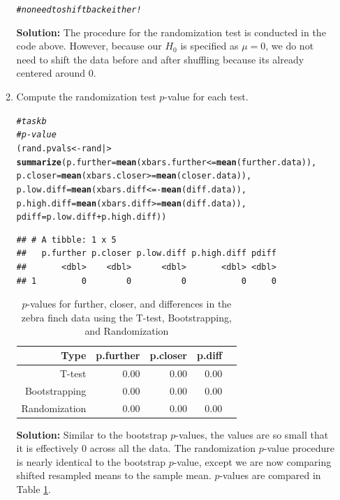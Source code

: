 \documentclass{article}\usepackage[]{graphicx}\usepackage[]{xcolor}
\makeatletter
\newcommand{\hlcom}[1]{\textcolor[rgb]{0.678,0.584,0.686}{\textit{#1}}}%
\newcommand{\hlopt}[1]{\textcolor[rgb]{0,0,0}{#1}}%
\newcommand{\hldef}[1]{\textcolor[rgb]{0.345,0.345,0.345}{#1}}%
\newcommand{\hlkwb}[1]{\textcolor[rgb]{0.69,0.353,0.396}{#1}}%
\newcommand{\hlkwc}[1]{\textcolor[rgb]{0.333,0.667,0.333}{#1}}%
\newcommand{\hlkwd}[1]{\textcolor[rgb]{0.737,0.353,0.396}{\textbf{#1}}}%
\newenvironment{kframe}{%
 \def\at@end@of@kframe{}%
 \ifinner\ifhmode%
  \def\at@end@of@kframe{\end{minipage}}%
  \begin{minipage}{\columnwidth}%
 \fi\fi%
 \def\FrameCommand##1{\hskip\@totalleftmargin \hskip-\fboxsep
 \colorbox{shadecolor}{##1}\hskip-\fboxsep
     \hskip-\linewidth \hskip-\@totalleftmargin \hskip\columnwidth}%
 \MakeFramed {\advance\hsize-\width
   \@totalleftmargin\z@ \linewidth\hsize
   \@setminipage}}%
 {\par\unskip\endMakeFramed%
 \at@end@of@kframe}
\newenvironment{knitrout}{}{} %
\makeatother
\begin{document}
\begin{enumerate}
\begin{enumerate}
\begin{knitrout}
\begin{kframe}
\begin{alltt}
\hlcom{# no need to shift back either!}
\end{alltt}
\end{kframe}
\end{knitrout}
\textbf{Solution:} The procedure for the randomization test is conducted in the code above. However, because our $H_0$ is specified as $\mu = 0$, we do not need to shift the data before and after shuffling because its already centered around $0$. 
  \item Compute the randomization test $p$-value for each test. \\
\begin{knitrout}
\color{fgcolor}\begin{kframe}
\begin{alltt}
\hlcom{# task b}
\hlcom{# p-value }
\hldef{(rand.pvals} \hlkwb{<-} \hldef{rand |>}
\hlkwd{summarize}\hldef{(}\hlkwc{p.further} \hldef{=} \hlkwd{mean}\hldef{(xbars.further} \hlopt{<=} \hlkwd{mean}\hldef{(further.data)),}
          \hlkwc{p.closer} \hldef{=} \hlkwd{mean}\hldef{(xbars.closer} \hlopt{>=} \hlkwd{mean}\hldef{(closer.data)),}
          \hlkwc{p.low.diff} \hldef{=} \hlkwd{mean}\hldef{(xbars.diff} \hlopt{<= -}\hlkwd{mean}\hldef{(diff.data)),}
          \hlkwc{p.high.diff} \hldef{=} \hlkwd{mean}\hldef{(xbars.diff} \hlopt{>=} \hlkwd{mean}\hldef{(diff.data)),}
          \hlkwc{pdiff} \hldef{= p.low.diff} \hlopt{+} \hldef{p.high.diff))}
\end{alltt}
\begin{verbatim}
## # A tibble: 1 x 5
##   p.further p.closer p.low.diff p.high.diff pdiff
##       <dbl>    <dbl>      <dbl>       <dbl> <dbl>
## 1         0        0          0           0     0
\end{verbatim}
\end{kframe}
\end{knitrout}
\begin{table}[ht]
\centering
\begin{tabular}{rrrrr}
  \hline
 Type & p.further & p.closer & p.diff \\ 
  \hline
T-test & 0.00 & 0.00 & 0.00 \\ 
  Bootstrapping & 0.00 & 0.00 & 0.00 \\
  Randomization & 0.00 & 0.00 & 0.00 \\
   \hline
\end{tabular}
\caption{$p$-values for further, closer, and differences in the zebra finch data using the T-test, Bootstrapping, and Randomization}
\label{table3}
\end{table}
  \textbf{Solution:} Similar to the bootstrap $p$-values, the values are so small that it is effectively $0$ across all the data. The randomization $p$-value procedure is nearly identical to the bootstrap $p$-value, except we are now comparing shifted resampled means to the sample mean. $p$-values are compared in Table \ref{table3}.
  

\end{enumerate}
\end{enumerate}
\end{document}
